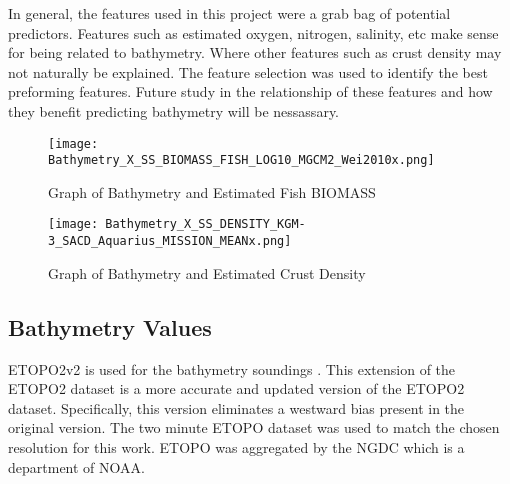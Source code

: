\par
In general, the features used in this project were a grab bag of potential predictors.
Features such as estimated oxygen, nitrogen, salinity, etc make sense for being related to bathymetry.
Where other features such as crust density may not naturally be explained.
The feature selection was used to identify the best preforming features.
Future study in the relationship of these features and how they benefit predicting bathymetry will be nessassary.


\begin{figure}[h]
    \centering
    \texttt{[image: Bathymetry\_X\_SS\_BIOMASS\_FISH\_LOG10\_MGCM2\_Wei2010x.png]}
    \caption{Graph of Bathymetry and Estimated Fish BIOMASS}
    \label{fig:bathyxfish}
\end{figure}


\begin{figure}[h]
    \centering
    \texttt{[image: Bathymetry\_X\_SS\_DENSITY\_KGM-3\_SACD\_Aquarius\_MISSION\_MEANx.png]}
    \caption{Graph of Bathymetry and Estimated Crust Density}
    \label{fig:bathyxdensity}
\end{figure}



\subsection{Bathymetry Values}
ETOPO2v2 is used for the bathymetry soundings \cite{national20062}.
This extension of the ETOPO2 dataset \cite{national1988etopo} is a more accurate and updated version of the ETOPO2 dataset.
Specifically, this version eliminates a westward bias present in the original version.
The two minute \ac{ETOPO} dataset was used to match the chosen resolution for this work.
\ac{ETOPO} was aggregated by the \ac{NGDC} which is a department of \ac{NOAA}.

